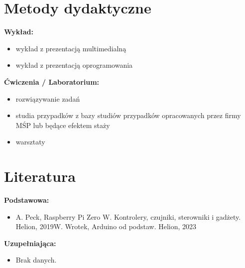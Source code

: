 \documentclass[12pt, a4paper]{article}
\begin{document}
\section{Metody dydaktyczne}

\textbf{Wykład:}
\begin{itemize}
  \item wykład z prezentacją multimedialną
  \item wykład z prezentacją oprogramowania
\end{itemize}
\vspace{4pt}
\textbf{Ćwiczenia / Laboratorium:}
\begin{itemize}
  \item rozwiązywanie zadań
  \item studia przypadków z bazy studiów przypadków opracowanych przez firmy MŚP lub będące efektem staży
  \item warsztaty
\end{itemize}
\vspace{4pt}


\section{Literatura}

\textbf{Podstawowa:}
\begin{itemize}
  \item A. Peck, Raspberry Pi Zero W. Kontrolery, czujniki, sterowniki i gadżety. Helion, 2019W. Wrotek, Arduino od podstaw. Helion, 2023
\end{itemize}

\textbf{Uzupełniająca:}
\begin{itemize}
  \item Brak danych.
\end{itemize}
\end{document}
